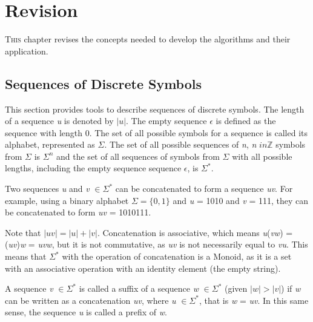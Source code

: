 \chapter{Revision}\label{cap:2}


{\lettrine[loversize=0.25,findent=0.2em,nindent=0em]{T}{his} chapter revises the concepts needed to develop the algorithms and their application.

\section{Sequences of Discrete Symbols}
This section provides tools to describe sequences of discrete symbols. The length of a sequence \textit{u} is denoted by $|\textit{u}|$. The empty sequence $\epsilon$ is defined as the sequence with length 0. The set of all possible symbols for a sequence is called its alphabet, represented as $\Sigma$. The set of all possible sequences of \textit{n}, \textit{n} $in \mathbb{Z}$ symbols from $\Sigma$ is $\Sigma^n$ and the set of all sequences of symbols from $\Sigma$ with all possible lengths, including the empty sequence sequence $\epsilon$, is $\Sigma^*$. 

Two sequences \textit{u} and \textit{v} $\in \Sigma^*$ can be concatenated to form a sequence \textit{uv}. For example, using a binary alphabet $\Sigma = \{0,1\}$ and \textit{u} = 1010 and \textit{v} = 111, they can be concatenated to form \textit{uv} = 1010111. 

Note that $|\textit{uv}| = |\textit{u}| + |\textit{v}|$. Concatenation is associative, which means \textit{u}(\textit{vw}) = (\textit{uv})\textit{w} = \textit{uvw}, but it is not commutative, as \textit{uv} is not necessarily equal to \textit{vu}. This means that $\Sigma^*$ with the operation of concatenation is a Monoid, as it is a set with an associative operation with an identity element (the empty string).

A sequence \textit{v} $\in \Sigma^*$ is called a suffix of a sequence \textit{w} $\in \Sigma^*$ (given $|\textit{w}| > |\textit{v}|$) if \textit{w} can be written as a concatenation \textit{uv}, where \textit{u} $\in \Sigma^*$, that is \textit{w} = \textit{uv}. In this same sense, the sequence \textit{u} is called a prefix of \textit{w}. 

}
